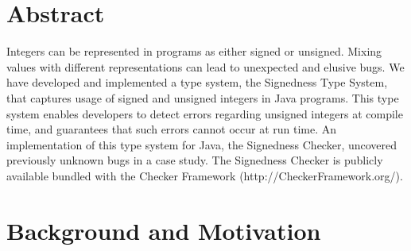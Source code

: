 \section*{Abstract}
Integers can be represented in programs as either signed or unsigned. Mixing
values with different representations can lead to unexpected and elusive bugs.
We have developed and implemented a type system, the Signedness Type System,
that captures usage of signed and unsigned integers in Java programs. This
type system enables developers to detect errors regarding unsigned integers at
compile time, and guarantees that such errors cannot occur at run time. An
implementation of this type system for Java, the Signedness Checker, uncovered
previously unknown bugs in a case study. The Signedness Checker is publicly
available bundled with the Checker Framework (http://CheckerFramework.org/).

\newpage
\tableofcontents

\newpage
\section{Background and Motivation} \label{prob}
